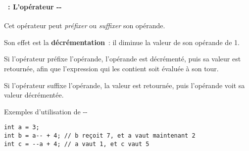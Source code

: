 \begin{frame}[containsverbatim]
  \frametitle{\secname}
  \framesubtitle{\subsecname~: L'opérateur -\relax-} 
  
  Cet opérateur peut \textit{préfixer} ou \textit{suffixer} son opérande. 
  \vspace{0.3cm}
  \par
  Son effet est la \textbf{décrémentation}~: il diminue la valeur de son opérande de 1.
  \vspace{0.3cm}
  \par
  Si l'opérateur préfixe l'opérande, l'opérande est décrémenté, puis sa valeur est retournée, afin que l'expression qui les contient soit évaluée à son tour.
  \vspace{0.3cm}
  \par
  Si l'opérateur suffixe l'opérande, la valeur est retournée, puis l'opérande voit sa valeur décrémentée.
  \vspace{0.3cm}
  \begin{exampleblock}{Exemples d'utilisation de -\relax-}
    \begin{verbatim}
int a = 3;
int b = a-- + 4; // b reçoit 7, et a vaut maintenant 2
int c = --a + 4; // a vaut 1, et c vaut 5\end{verbatim}        
  \end{exampleblock}
\end{frame}

